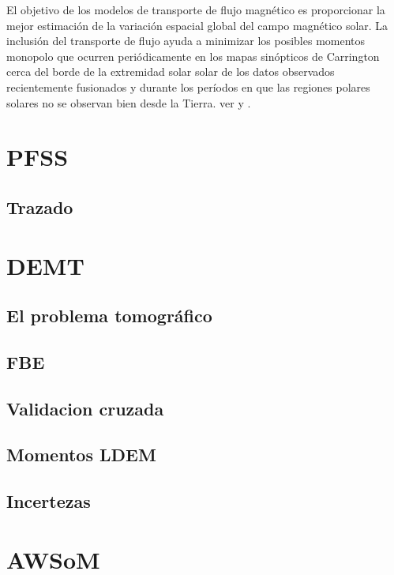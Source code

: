 El objetivo de los modelos de transporte de flujo magnético es proporcionar la mejor estimación de la variación espacial global del campo magnético solar. La inclusión del transporte de flujo ayuda a minimizar los posibles momentos monopolo que ocurren periódicamente en los mapas sinópticos de Carrington cerca del borde de la extremidad solar solar de los datos observados recientemente fusionados y durante los períodos en que las regiones polares solares no se observan bien desde la Tierra. ver \citep{arge_2010} y \citep{hickmann_2015}.

\section{PFSS}
\subsection{Trazado}

\section{DEMT}
\subsection{El problema tomográfico}
\subsection{FBE}
\subsection{Validacion cruzada}
\subsection{Momentos LDEM}
\subsection{Incertezas}

\section{AWSoM}\label{ch1:opts}





%


%

